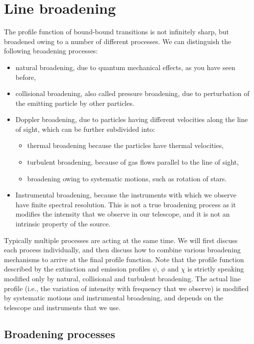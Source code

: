 \documentclass[12pt]{article}
\numberwithin{equation}{section}
\begin{document}
\section{Line broadening}

The profile function of bound-bound transitions is not infinitely sharp, but broadened owing to a number of different processes. We can distinguish the following broadening processes:
\begin{itemize}
\item natural broadening, due to quantum mechanical effects, as you have seen before,
\item collisional broadening, also called pressure broadening, due to perturbation of the emitting particle by other particles.
\item Doppler broadening, due to particles having different velocities along the line of sight, which can be further subdivided into:
\begin{itemize}	
\item thermal broadening because the particles have thermal velocities,
\item turbulent broadening, because of gas flows parallel to the line of sight,
\item broadening owing to systematic motions, such as rotation of stars.
\end{itemize}	
\item Instrumental broadening, because the instruments with which we observe have finite spectral resolution. This is not a true broadening process as it modifies the intensity that we observe in our telescope, and it is not an intrinsic property of the source.
\end{itemize}
Typically multiple processes are acting at the same time. We will first discuss each process individually, and then discuss how to combine various broadening mechanisms to arrive at the final profile function. Note that the profile function described by the extinction and emission profiles $\psi$, $\phi$ and $\chi$ is strictly speaking modified only by natural, collisional and turbulent broadening. The actual line profile (i.e., the variation of intensity with frequency that we observe) is modified by systematic motions and instrumental broadening, and depends on the telescope and instruments that we use.

\subsection{Broadening processes}
\end{document}
